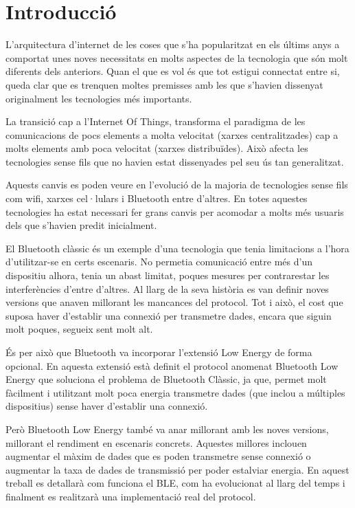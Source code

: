 \cleardoublepage
{}
\chapter*{Introducció}
L'arquitectura d'internet de les coses que s'ha popularitzat en els últims anys a comportat unes noves necessitats en molts aspectes de la tecnologia que són molt diferents dels anteriors.
Quan el que es vol és que tot estigui connectat entre si, queda clar que es trenquen moltes premisses amb les que s'havien dissenyat originalment les tecnologies més importants.

La transició cap a l'Internet Of Things, transforma el paradigma de les comunicacions de pocs elements a molta velocitat (xarxes centralitzades) cap a molts elements amb poca velocitat (xarxes distribuïdes).
Això afecta les tecnologies sense fils que no havien estat dissenyades pel seu ús tan generalitzat.

Aquests canvis es poden veure en l'evolució de la majoria de tecnologies sense fils com wifi, xarxes cel·lulars i Bluetooth entre d'altres.
En totes aquestes tecnologies ha estat necessari fer grans canvis per acomodar a molts més usuaris dels que s'havien predit inicialment.

El Bluetooth clàssic és un exemple d'una tecnologia que tenia limitacions a l'hora d'utilitzar-se en certs escenaris.
No permetia comunicació entre més d'un dispositiu alhora, tenia un abast limitat, poques mesures per contrarestar les interferències d'entre d'altres.
Al llarg de la seva història es van definir noves versions que anaven millorant les mancances del protocol.
Tot i això, el cost que suposa haver d'establir una connexió per transmetre dades, encara que siguin molt poques, segueix sent molt alt.

És per això que Bluetooth va incorporar l'extensió Low Energy de forma opcional.
En aquesta extensió està definit el protocol anomenat Bluetooth Low Energy que soluciona el problema de Bluetooth Clàssic, ja que, permet molt fàcilment i utilitzant molt poca energia transmetre dades (que inclou a múltiples dispositius) sense haver d'establir una connexió.

Però Bluetooth Low Energy també va anar millorant amb les noves versions, millorant el rendiment en escenaris concrets.
Aquestes millores inclouen augmentar el màxim de dades que es poden transmetre sense connexió o augmentar la taxa de dades de transmissió per poder estalviar energia.
En aquest treball es detallarà com funciona el BLE, com ha evolucionat al llarg del temps i finalment es realitzarà una implementació real del protocol.